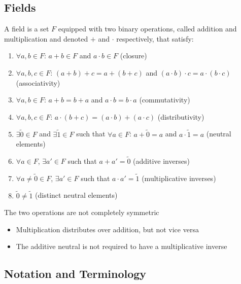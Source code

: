 \subsection{Fields}

\begin{definition}[Field]\label{def:field}
    A field is a set $F$ equipped with two binary operations, called addition and multiplication and denoted $+$ and $\cdot$ respectively, that satisfy:
    \begin{enumerate}[label=(\roman*)]
        \item $\forall a, b \in F$: $a + b \in F$ and $a \cdot b \in F$ (closure)
        \item $\forall a, b, c \in F$: $(a + b) + c = a + (b + c)$ and $(a \cdot b) \cdot c = a \cdot (b \cdot c)$ (associativity)
        \item $\forall a, b \in F$: $a + b = b + a$ and $a \cdot b = b \cdot a$ (commutativity)
        \item $\forall a, b, c \in F$: $a \cdot (b + c) = (a \cdot b) + (a \cdot c)$ (distributivity)
        \item $\exists \tilde{0} \in F$ and $\exists \tilde{1} \in F$ such that $\forall a \in F$: $a + \tilde{0} = a$ and $a \cdot \tilde{1} = a$ (neutral elements)
        \item $\forall a \in F$, $\exists a' \in F$ such that $a + a' = \tilde{0}$ (additive inverses)
        \item $\forall a \neq \tilde{0} \in F$, $\exists a' \in F$ such that $a \cdot a' = \tilde{1}$ (multiplicative inverses)
        \item $\tilde{0} \neq \tilde{1}$ (distinct neutral elements)
    \end{enumerate}
\end{definition}

\begin{note} The two operations are not completely symmetric
    \begin{itemize}
        \item Multiplication distributes over addition, but not vice versa
        \item The additive neutral is not required to have a multiplicative inverse
    \end{itemize}
\end{note}

\subsection{Notation and Terminology}

